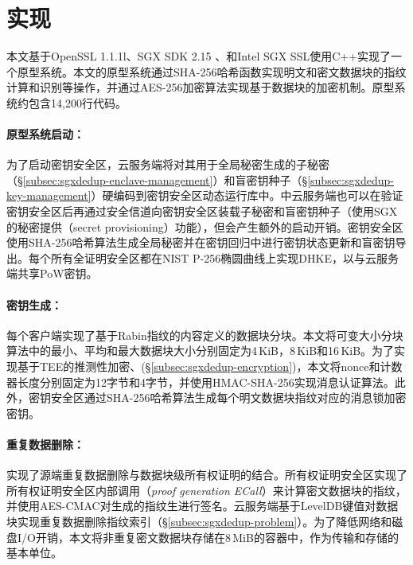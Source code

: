 \section{\sysnameS 实现}
\label{sec:sgxdedup-implementation}

本文基于OpenSSL 1.1.1l\cite{openssl}、SGX SDK 2.15\cite{sgxsdk} 、和Intel SGX SSL\cite{sgxssl}使用C++实现了一个\sysnameS 原型系统。本文的原型系统通过SHA-256哈希函数实现明文和密文数据块的指纹计算和识别等操作，并通过AES-256加密算法实现基于数据块的加密机制。原型系统约包含14,200行代码。

\paragraph*{原型系统启动：} 
为了启动密钥安全区，云服务端将对其用于全局秘密生成的子秘密（\S\ref{subsec:sgxdedup-enclave-management}）和盲密钥种子（\S\ref{subsec:sgxdedup-key-management}）硬编码到密钥安全区动态运行库中。\sysnameS 中云服务端也可以在验证密钥安全区后再通过安全信道向密钥安全区装载子秘密和盲密钥种子（使用SGX\cite{sgx}的秘密提供（secret provisioning）功能），但会产生额外的启动开销。密钥安全区使用SHA-256哈希算法生成全局秘密并在密钥回归中进行密钥状态更新和盲密钥导出。每个所有全证明安全区都在NIST P-256椭圆曲线上实现DHKE，以与云服务端共享PoW密钥。

\paragraph*{密钥生成：}每个客户端实现了基于Rabin指纹\cite{rabin81}的内容定义的数据块分块。本文将可变大小分块算法中的最小、平均和最大数据块大小分别固定为4\,KiB，8\,KiB和16\,KiB。为了实现基于TEE的推测性加密、(\S\ref{subsec:sgxdedup-encryption})，本文将nonce和计数器长度分别固定为12字节和4字节，并使用HMAC-SHA-256实现消息认证算法。此外，密钥安全区通过SHA-256哈希算法生成每个明文数据块指纹对应的消息锁加密密钥。

\paragraph*{重复数据删除：}\sysnameS 实现了源端重复数据删除与数据块级所有权证明的结合。所有权证明安全区实现了所有权证明安全区内部调用（\textit{proof generation ECall}）来计算密文数据块的指纹，并使用AES-CMAC对生成的指纹生进行签名。云服务端基于LevelDB\cite{leveldb}键值对数据块实现重复数据删除指纹索引（\S\ref{subsec:sgxdedup-problem}）。为了降低网络和磁盘I/O开销，本文将非重复密文数据块存储在8\,MiB的容器中，作为传输和存储的基本单位\cite{lillibridge13}。

